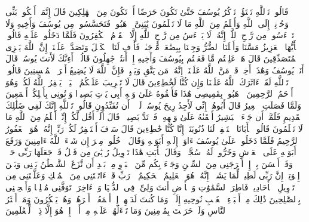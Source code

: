\stopbuffer%
\startbuffer[\q:12:85]
قَالُوا۟ تَٱللَّهِ تَفۡتَؤُا۟ تَذۡكُرُ یُوسُفَ حَتَّىٰ تَكُونَ حَرَضًا أَوۡ تَكُونَ مِنَ ٱلۡهَٰلِكِینَ%
\stopbuffer%
\startbuffer[\q:12:86]
قَالَ إِنَّمَاۤ أَشۡكُوا۟ بَثِّی وَحُزۡنِیۤ إِلَى ٱللَّهِ وَأَعۡلَمُ مِنَ ٱللَّهِ مَا لَا تَعۡلَمُونَ%
\stopbuffer%
\startbuffer[\q:12:87]
یَٰبَنِیَّ ٱذۡهَبُوا۟ فَتَحَسَّسُوا۟ مِن یُوسُفَ وَأَخِیهِ وَلَا تَا۟یۡءَسُوا۟ مِن رَّوۡحِ ٱللَّهِۖ إِنَّهُۥ لَا یَا۟یۡءَسُ مِن رَّوۡحِ ٱللَّهِ إِلَّا ٱلۡقَوۡمُ ٱلۡكَٰفِرُونَ%
\stopbuffer%
\startbuffer[\q:12:88]
فَلَمَّا دَخَلُوا۟ عَلَیۡهِ قَالُوا۟ یَٰۤأَیُّهَا ٱلۡعَزِیزُ مَسَّنَا وَأَهۡلَنَا ٱلضُّرُّ وَجِئۡنَا بِبِضَٰعَةࣲ مُّزۡجَىٰةࣲ فَأَوۡفِ لَنَا ٱلۡكَیۡلَ وَتَصَدَّقۡ عَلَیۡنَاۤۖ إِنَّ ٱللَّهَ یَجۡزِی ٱلۡمُتَصَدِّقِینَ%
\stopbuffer%
\startbuffer[\q:12:89]
قَالَ هَلۡ عَلِمۡتُم مَّا فَعَلۡتُم بِیُوسُفَ وَأَخِیهِ إِذۡ أَنتُمۡ جَٰهِلُونَ%
\stopbuffer%
\startbuffer[\q:12:90]
قَالُوۤا۟ أَءِنَّكَ لَأَنتَ یُوسُفُۖ قَالَ أَنَا۠ یُوسُفُ وَهَٰذَاۤ أَخِیۖ قَدۡ مَنَّ ٱللَّهُ عَلَیۡنَاۤۖ إِنَّهُۥ مَن یَتَّقِ وَیَصۡبِرۡ فَإِنَّ ٱللَّهَ لَا یُضِیعُ أَجۡرَ ٱلۡمُحۡسِنِینَ%
\stopbuffer%
\startbuffer[\q:12:91]
قَالُوا۟ تَٱللَّهِ لَقَدۡ ءَاثَرَكَ ٱللَّهُ عَلَیۡنَا وَإِن كُنَّا لَخَٰطِءِینَ%
\stopbuffer%
\startbuffer[\q:12:92]
قَالَ لَا تَثۡرِیبَ عَلَیۡكُمُ ٱلۡیَوۡمَۖ یَغۡفِرُ ٱللَّهُ لَكُمۡۖ وَهُوَ أَرۡحَمُ ٱلرَّٰحِمِینَ%
\stopbuffer%
\startbuffer[\q:12:93]
ٱذۡهَبُوا۟ بِقَمِیصِی هَٰذَا فَأَلۡقُوهُ عَلَىٰ وَجۡهِ أَبِی یَأۡتِ بَصِیرࣰا وَأۡتُونِی بِأَهۡلِكُمۡ أَجۡمَعِینَ%
\stopbuffer%
\startbuffer[\q:12:94]
وَلَمَّا فَصَلَتِ ٱلۡعِیرُ قَالَ أَبُوهُمۡ إِنِّی لَأَجِدُ رِیحَ یُوسُفَۖ لَوۡلَاۤ أَن تُفَنِّدُونِ%
\stopbuffer%
\startbuffer[\q:12:95]
قَالُوا۟ تَٱللَّهِ إِنَّكَ لَفِی ضَلَٰلِكَ ٱلۡقَدِیمِ%
\stopbuffer%
\startbuffer[\q:12:96]
فَلَمَّاۤ أَن جَاۤءَ ٱلۡبَشِیرُ أَلۡقَىٰهُ عَلَىٰ وَجۡهِهِۦ فَٱرۡتَدَّ بَصِیرࣰاۖ قَالَ أَلَمۡ أَقُل لَّكُمۡ إِنِّیۤ أَعۡلَمُ مِنَ ٱللَّهِ مَا لَا تَعۡلَمُونَ%
\stopbuffer%
\startbuffer[\q:12:97]
قَالُوا۟ یَٰۤأَبَانَا ٱسۡتَغۡفِرۡ لَنَا ذُنُوبَنَاۤ إِنَّا كُنَّا خَٰطِءِینَ%
\stopbuffer%
\startbuffer[\q:12:98]
قَالَ سَوۡفَ أَسۡتَغۡفِرُ لَكُمۡ رَبِّیۤۖ إِنَّهُۥ هُوَ ٱلۡغَفُورُ ٱلرَّحِیمُ%
\stopbuffer%
\startbuffer[\q:12:99]
فَلَمَّا دَخَلُوا۟ عَلَىٰ یُوسُفَ ءَاوَىٰۤ إِلَیۡهِ أَبَوَیۡهِ وَقَالَ ٱدۡخُلُوا۟ مِصۡرَ إِن شَاۤءَ ٱللَّهُ ءَامِنِینَ%
\stopbuffer%
\startbuffer[\q:12:100]
وَرَفَعَ أَبَوَیۡهِ عَلَى ٱلۡعَرۡشِ وَخَرُّوا۟ لَهُۥ سُجَّدࣰاۖ وَقَالَ یَٰۤأَبَتِ هَٰذَا تَأۡوِیلُ رُءۡیَٰیَ مِن قَبۡلُ قَدۡ جَعَلَهَا رَبِّی حَقࣰّاۖ وَقَدۡ أَحۡسَنَ بِیۤ إِذۡ أَخۡرَجَنِی مِنَ ٱلسِّجۡنِ وَجَاۤءَ بِكُم مِّنَ ٱلۡبَدۡوِ مِنۢ بَعۡدِ أَن نَّزَغَ ٱلشَّیۡطَٰنُ بَیۡنِی وَبَیۡنَ إِخۡوَتِیۤۚ إِنَّ رَبِّی لَطِیفࣱ لِّمَا یَشَاۤءُۚ إِنَّهُۥ هُوَ ٱلۡعَلِیمُ ٱلۡحَكِیمُ%
\stopbuffer%
\startbuffer[\q:12:101]
۞ رَبِّ قَدۡ ءَاتَیۡتَنِی مِنَ ٱلۡمُلۡكِ وَعَلَّمۡتَنِی مِن تَأۡوِیلِ ٱلۡأَحَادِیثِۚ فَاطِرَ ٱلسَّمَٰوَٰتِ وَٱلۡأَرۡضِ أَنتَ وَلِیِّۦ فِی ٱلدُّنۡیَا وَٱلۡءَاخِرَةِۖ تَوَفَّنِی مُسۡلِمࣰا وَأَلۡحِقۡنِی بِٱلصَّٰلِحِینَ%
\stopbuffer%
\startbuffer[\q:12:102]
ذَٰلِكَ مِنۡ أَنۢبَاۤءِ ٱلۡغَیۡبِ نُوحِیهِ إِلَیۡكَۖ وَمَا كُنتَ لَدَیۡهِمۡ إِذۡ أَجۡمَعُوۤا۟ أَمۡرَهُمۡ وَهُمۡ یَمۡكُرُونَ%
\stopbuffer%
\startbuffer[\q:12:103]
وَمَاۤ أَكۡثَرُ ٱلنَّاسِ وَلَوۡ حَرَصۡتَ بِمُؤۡمِنِینَ%
\stopbuffer%
\startbuffer[\q:12:104]
وَمَا تَسۡءَلُهُمۡ عَلَیۡهِ مِنۡ أَجۡرٍۚ إِنۡ هُوَ إِلَّا ذِكۡرࣱ لِّلۡعَٰلَمِینَ%
\stopbuffer%
